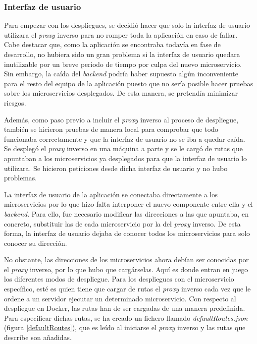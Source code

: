 \documentclass[11pt,spanish,listoffigures]{tfgetsinf}
\begin{document}

			\subsubsection{Interfaz de usuario}

Para empezar con los despliegues, se decidió hacer que solo la interfaz de usuario utilizara el \emph{proxy} inverso para no romper toda la aplicación en caso de fallar. Cabe destacar que, como la aplicación se encontraba todavía en fase de desarrollo, no hubiera sido un gran problema si la interfaz de usuario quedara inutilizable por un breve periodo de tiempo por culpa del nuevo microservicio. Sin embargo, la caída del \emph{backend} podría haber supuesto algún inconveniente para el resto del equipo de la aplicación puesto que no sería posible hacer pruebas sobre los microservicios desplegados. De esta manera, se pretendía minimizar riesgos.

Además, como paso previo a incluir el \emph{proxy} inverso al proceso de despliegue, también se hicieron pruebas de manera local para comprobar que todo funcionaba correctamente y que la interfaz de usuario no se iba a quedar caída. Se desplegó el \emph{proxy} inverso en una máquina a parte y se le cargó de rutas que apuntaban a los microservicios ya desplegados para que la interfaz de usuario lo utilizara. Se hicieron peticiones desde dicha interfaz de usuario y no hubo problemas.

La interfaz de usuario de la aplicación se conectaba directamente a los microservicios por lo que hizo falta interponer el nuevo componente entre ella y el \emph{backend}. Para ello, fue necesario modificar las direcciones a las que apuntaba, en concreto, substituir las de cada microservicio por la del \emph{proxy} inverso. De esta forma, la interfaz de usuario dejaba de conocer todos los microservicios para solo conocer su dirección.

No obstante, las direcciones de los microservicios ahora debían ser conocidas por el \emph{proxy} inverso, por lo que hubo que cargárselas. Aquí es donde entran en juego los diferentes modos de despliegue. Para los despliegues con el microservicio específico, esté es quien tiene que cargar de rutas el \emph{proxy} inverso cada vez que le ordene a un servidor ejecutar un determinado microservicio. Con respecto al despliegue en Docker, las rutas han de ser cargadas de una manera predefinida. Para especificar dichas rutas, se ha creado un fichero llamado \emph{defaultRoutes.json} (figura \ref{defaultRoutes}), que es leído al iniciarse el \emph{proxy} inverso y las rutas que describe son añadidas.
\end{document}
